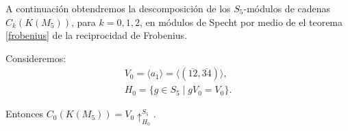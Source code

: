 \documentclass[12pt]{book}
\theoremstyle{definition}
\newcounter{in}
\begin{document}
A continuación obtendremos la descomposición de los $S_{5}$-módulos de
cadenas $C_{k}(K(M_{5}))$, para $k=0,1,2$, en
módulos de Specht por medio de el teorema \ref{frobenius} de la reciprocidad de Frobenius.

Consideremos:
\begin{eqnarray*}
V_{0}=\langle a_{1}\rangle=\langle
(\overline{12},\overline{34})\rangle,\\
H_{0}=\{g\in S_{5}\mid gV_{0}=V_{0}\}.
\end{eqnarray*}

Entonces $C_{0}(K(M_{5}))=V_{0}\uparrow^{S_{5}}_{H_0}$.

  \begin{table}[!hbtp]
    \centering
    
    \caption{Caracteres de $S_{5}$ restringidos a $H_{0}$ y carácter de $V_{0}$}
    \label{tab:clanes-H_0-5}
  \end{table}
\end{document}
